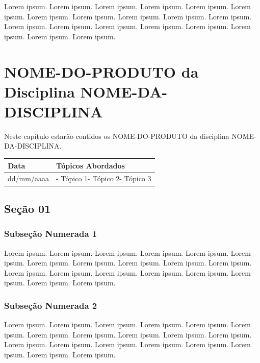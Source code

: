 \documentclass[
]{book}
\begin{document}
Lorem ipsum. Lorem ipsum. Lorem ipsum. Lorem ipsum. Lorem ipsum. Lorem ipsum. Lorem ipsum. Lorem ipsum. Lorem ipsum. Lorem ipsum. Lorem ipsum. Lorem ipsum. Lorem ipsum. Lorem ipsum. Lorem ipsum. Lorem ipsum. Lorem ipsum. Lorem ipsum. Lorem ipsum.

\hypertarget{nome-do-produto-da-disciplina-nome-da-disciplina}{%
\chapter{NOME-DO-PRODUTO da Disciplina NOME-DA-DISCIPLINA}\label{nome-do-produto-da-disciplina-nome-da-disciplina}}

Neste capítulo estarão contidos os NOME-DO-PRODUTO da disciplina NOME-DA-DISCIPLINA.

\begin{longtable}[]{@{}ll@{}}
\toprule()
Data & Tópicos Abordados \\
\midrule()
\endhead
dd/mm/aaaa & - Tópico 1- Tópico 2- Tópico 3 \\
\bottomrule()
\end{longtable}

\hypertarget{seuxe7uxe3o-01}{%
\section{Seção 01}\label{seuxe7uxe3o-01}}

\hypertarget{subseuxe7uxe3o-numerada-1}{%
\subsection{Subseção Numerada 1}\label{subseuxe7uxe3o-numerada-1}}

Lorem ipsum. Lorem ipsum. Lorem ipsum. Lorem ipsum. Lorem ipsum. Lorem ipsum. Lorem ipsum. Lorem ipsum. Lorem ipsum. Lorem ipsum. Lorem ipsum. Lorem ipsum. Lorem ipsum. Lorem ipsum. Lorem ipsum. Lorem ipsum. Lorem ipsum. Lorem ipsum. Lorem ipsum.

\hypertarget{subseuxe7uxe3o-numerada-2}{%
\subsection{Subseção Numerada 2}\label{subseuxe7uxe3o-numerada-2}}

Lorem ipsum. Lorem ipsum. Lorem ipsum. Lorem ipsum. Lorem ipsum. Lorem ipsum. Lorem ipsum. Lorem ipsum. Lorem ipsum. Lorem ipsum. Lorem ipsum. Lorem ipsum. Lorem ipsum. Lorem ipsum. Lorem ipsum. Lorem ipsum. Lorem ipsum. Lorem ipsum. Lorem ipsum.
\end{document}
